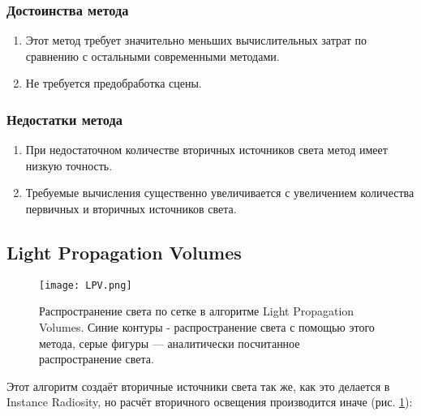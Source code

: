 \documentclass[12pt,fleqn]{article}
\begin{document}
\subsubsection{Достоинства метода}

\begin{enumerate}

\item Этот метод требует значительно меньших вычислительных затрат по сравнению с остальными современными методами.

\item Не требуется предобработка сцены.

\end{enumerate}

\subsubsection{Недостатки метода}

\begin{enumerate}

\item При недостаточном количестве вторичных источников света метод имеет низкую точность.

\item Требуемые вычисления существенно увеличивается с увеличением количества первичных и вторичных источников света.

\end{enumerate}

\subsection{Light Propagation Volumes}

\begin{figure}[htb]
    \centering
    \texttt{[image: LPV.png]}
    \caption{Распространение света по сетке в алгоритме Light Propagation Volumes. Синие контуры - распространение света с помощью этого метода, серые фигуры --- аналитически посчитанное распространение света.}
    \label{lpv}
\end{figure}

Этот алгоритм \cite{LightPropagationVolumes} создаёт вторичные источники света так же, как это делается в Instance Radiosity, но расчёт вторичного освещения производится иначе (рис. \ref{lpv}):
\end{document}
